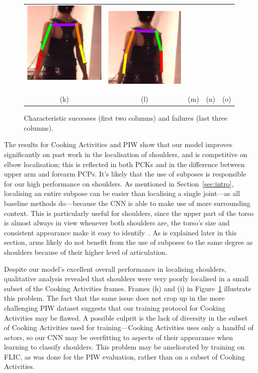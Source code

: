 \documentclass[runningheads]{llncs}
\begin{document}
\begin{figure}[t]
\begin{center}
\begin{tabular}{@{}c@{}c c@{}c@{}c@{}}
\includegraphics[width=0.17\linewidth]{figures/shots-cropped/h36m-s24f12-bad-flip-1.jpg}\,&
\includegraphics[width=0.17\linewidth]{figures/shots-cropped/h36m-s24f14-bad-flip-2.jpg}\\
(k) & (l) & (m) & (n) & (o)
\end{tabular}
\end{center}
\vspace{-6mm}
\caption{Characteristic successes (first two columns) and failures (last three
columns).}
\label{fig:qualitative}
\end{figure}

The results for Cooking Activities and PIW show that our model improves
significantly on past work in the localisation of shoulders, and is competitive
on elbow localisation; this is reflected in both PCKs and in the difference
between upper arm and forearm PCPs. It's likely that the use of subposes is
responsible for our high performance on shoulders. As mentioned in
Section~\ref{sec:intro}, localising an entire subpose can be easier than
localising a single joint---as all baseline methods do---because the CNN is
able to make use of more surrounding context. This is particularly useful for
shoulders, since the upper part of the torso is almost always in view whenever
both shoulders are, the torso's size and consistent appearance make it easy to
identify~\cite{mori2004recovering}. As is explained later in this section, arms
likely do not benefit from the use of subposes to the same degree as shoulders
because of their higher level of articulation.

Despite our model's excellent overall performance in localising shoulders,
qualitative analysis revealed that shoulders were very poorly localised in a
small subset of the Cooking Activities frames. Frames (h) and (i) in
Figure~\ref{fig:qualitative} illustrate this problem. The fact that the same
issue does not crop up in the more challenging PIW dataset suggests that our
training protocol for Cooking Activities may be flawed. A possible culprit is
the lack of diversity in the subset of Cooking Activities used for
training---Cooking Activities uses only a handful of actors, so our CNN may be
overfitting to aspects of their appearance when learning to classify shoulders.
This problem may be ameliorated by training on FLIC, as was done for the PIW
evaluation, rather than on a subset of Cooking Activities.
\end{document}
